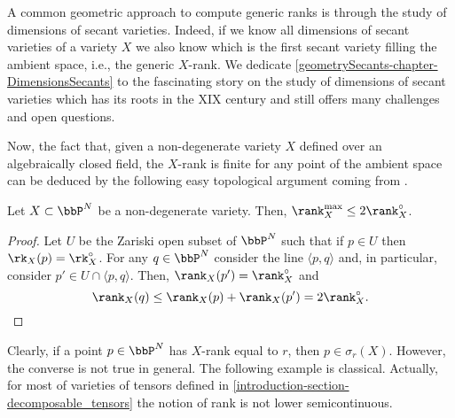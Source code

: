  \begin{remark}
    \label{geometrySecants-remark-generic_rank_strategy}
    A common geometric approach to compute generic ranks is through the study of dimensions of secant varieties. Indeed, if we know all dimensions of secant varieties of a variety $X$ we also know which is the first secant variety filling the ambient space, i.e., the generic $X$-rank. We dedicate \ref{geometrySecants-chapter-DimensionsSecants} to the fascinating story on the study of dimensions of secant varieties which has its roots in the XIX century and still offers many challenges and open questions.
 \end{remark}


 Now, the fact that, given a non-degenerate variety $X$ defined over an algebraically closed field, the $X$-rank is finite for any point of the ambient space can be deduced by the following easy topological argument coming from \cite{BT15}. 
 
 \begin{theorem}
    \label{geometrySecants-theorem-BT_maxrank_upperbound}
    Let $X \subset \bbP^N$ be a non-degenerate variety. Then, $\rank_X^{\max} \leq 2\rank_X^\circ$. 
 \end{theorem}
 \begin{proof}
    Let $U$ be the Zariski open subset of $\bbP^N$ such that if $p \in U$ then $\rk_X(p) = \rk^\circ_X$. For any $q \in \bbP^N$ consider the line $\langle p,q \rangle$ and, in particular, consider $p' \in U \cap \langle p,q \rangle$. Then, $\rank_X(p') = \rank_X^\circ$ and \[\rank_X(q) \leq \rank_X(p) + \rank_X(p') = 2\rank_X^\circ.\] 
 \end{proof}


  Clearly, if a point $p \in \bbP^N$ has $X$-rank equal to $r$, then $p \in \sigma_r(X)$. However, the converse is not true in general. The following example is classical. Actually, for most of varieties of tensors defined in \ref{introduction-section-decomposable_tensors} the notion of rank is not lower semicontinuous.
 
